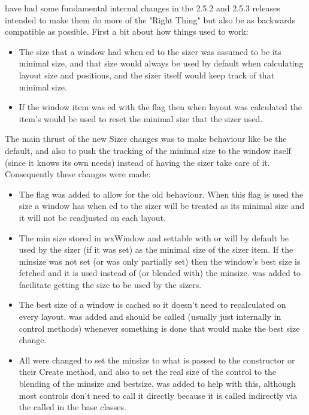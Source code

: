 
 have had some fundamental internal changes in the 2.5.2 and 2.5.3 releases intended to make them do more of the "Right Thing" but also be as backwards compatible as possible.  First a bit about how things used to work:

\begin{itemize}\itemsep=0pt
\item The size that a window had when ed to the sizer was assumed to be its minimal size, and that size would always be used by default when calculating layout size and positions, and the sizer itself would keep track of that minimal size.
\item If the window item was ed with the  flag then when layout was calculated the item's  would be used to reset the minimal size that the sizer used.
\end{itemize}

The main thrust of the new Sizer changes was to make behaviour like  be the default, and also to push the tracking of the minimal size to the window itself (since it knows its own needs) instead of having the sizer take care of it.  Consequently these changes were made:

\begin{itemize}\itemsep=0pt
\item The  flag was added to allow for the old behaviour.  When this flag is used the size a window has when ed to the sizer will be treated as its minimal size and it will not be readjusted on each layout.
\item The min size stored in wxWindow and settable with  or  will by default be used by the sizer (if it was set) as the minimal size of the sizer item.  If the minsize was not set (or was only partially set) then the window's best size is fetched and it is used instead of (or blended with) the minsize.   was added to facilitate getting the size to be used by the sizers.
\item The best size of a window is cached so it doesn't need to recalculated on every layout.  was added and should be called (usually just internally in control methods) whenever something is done that would make the best size change.
\item All  were changed to set the minsize to what is passed to the constructor or their Create method, and also to set the real size of the control to the blending of the minsize and bestsize.   was added to help with this, although most controls don't need to call it directly because it is called indirectly via the  called in the base classes.
\end{itemize}

